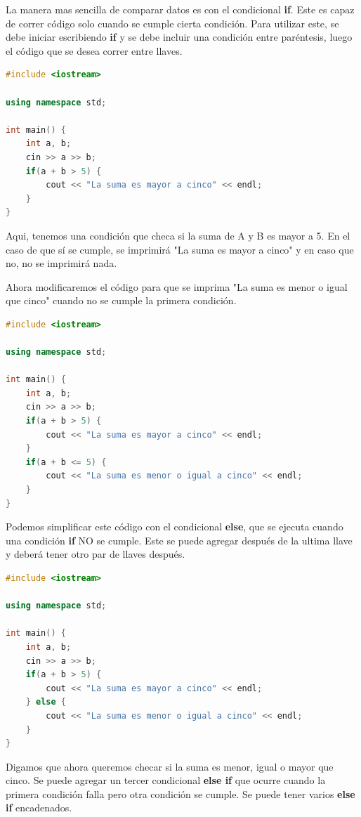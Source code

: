 \documentclass{article}
\begin{document}
La manera mas sencilla de comparar datos es con el condicional \textbf{if}. Este es capaz de correr código solo cuando se cumple cierta condición. Para utilizar este, se debe iniciar escribiendo \textbf{if} y se debe incluir una condición entre paréntesis, luego el código que se desea correr entre llaves.

\begin{lstlisting}[language=C++, caption=Condiciones]
#include <iostream>

using namespace std;

int main() {
    int a, b;
    cin >> a >> b;
    if(a + b > 5) {
        cout << "La suma es mayor a cinco" << endl;
    }
}
\end{lstlisting}

Aqui, tenemos una condición que checa si la suma de A y B es mayor a 5. En el caso de que sí se cumple, se imprimirá "La suma es mayor a cinco" y en caso que no, no se imprimirá nada.

Ahora modificaremos el código para que se imprima "La suma es menor o igual que cinco" cuando no se cumple la primera condición.

\begin{lstlisting}[language=C++, caption=Condiciones]
#include <iostream>

using namespace std;

int main() {
    int a, b;
    cin >> a >> b;
    if(a + b > 5) {
        cout << "La suma es mayor a cinco" << endl;
    }
    if(a + b <= 5) {
        cout << "La suma es menor o igual a cinco" << endl;
    }
}
\end{lstlisting}

Podemos simplificar este código con el condicional \textbf{else}, que se ejecuta cuando una condición \textbf{if} NO se cumple. Este se puede agregar después de la ultima llave y deberá tener otro par de llaves después.

\begin{lstlisting}[language=C++, caption=Else]
#include <iostream>

using namespace std;

int main() {
    int a, b;
    cin >> a >> b;
    if(a + b > 5) {
        cout << "La suma es mayor a cinco" << endl;
    } else {
        cout << "La suma es menor o igual a cinco" << endl;
    }
}
\end{lstlisting}

Digamos que ahora queremos checar si la suma es menor, igual o mayor que cinco. Se puede agregar un tercer condicional \textbf{else if} que ocurre cuando la primera condición falla pero otra condición se cumple. Se puede tener varios \textbf{else if} encadenados.
\end{document}

